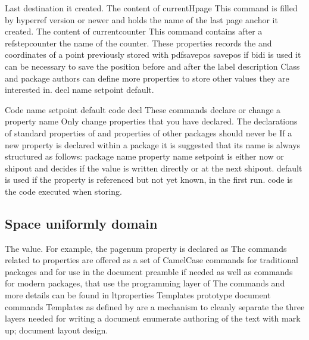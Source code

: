 \documentclass{article}
\begin{document}
Last destination it created. The content of currentHpage This command is filled by hyperref version or newer and holds the name of the last page anchor it created. The content of currentcounter This command contains after a refstepcounter the name of the counter. These properties records the and coordinates of a point previously stored with pdfsavepos savepos if bidi is used it can be necessary to save the position before and after the label description Class and package authors can define more properties to store other values they are interested in. decl name setpoint default.

Code name setpoint default code decl These commands declare or change a property name Only change properties that you have declared. The declarations of standard properties of and properties of other packages should never be If a new property is declared within a package it is suggested that its name is always structured as follows: package name property name setpoint is either now or shipout and decides if the value is written directly or at the next shipout. default is used if the property is referenced but not yet known, in the first run. code is the code executed when storing.

\subsection{Space uniformly domain}
The value. For example, the pagenum property is declared as The commands related to properties are offered as a set of CamelCase commands for traditional packages and for use in the document preamble if needed as well as commands for modern packages, that use the programming layer of The commands and more details can be found in ltproperties Templates prototype document commands Templates as defined by are a mechanism to cleanly separate the three layers needed for writing a document enumerate authoring of the text with mark up; document layout design.
\end{document}
